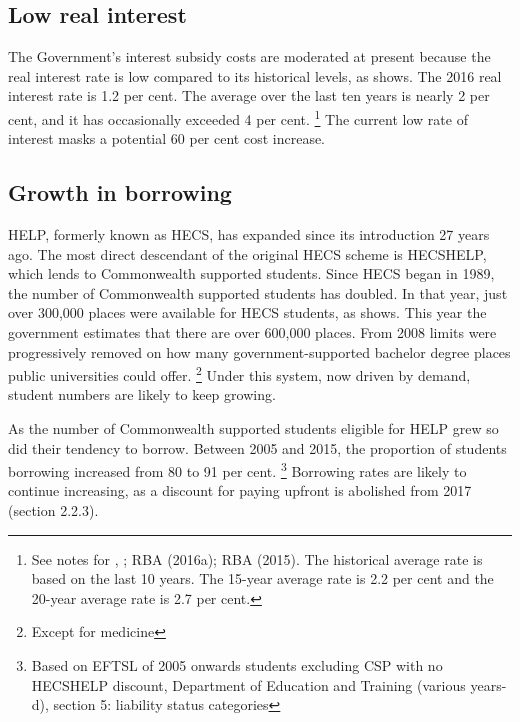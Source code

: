 \documentclass[embargoed]{grattan}
\begin{document}
\subsection{Low real interest}\label{low-real-interest}

The Government's interest subsidy costs are moderated at present because the real interest rate is low compared to its historical levels, as  shows.
The 2016 real interest rate is 1.2 per cent.
The average over the last ten years is nearly 2 per cent, and it has occasionally exceeded 4 per cent.%
\footnote{See notes for , \textcite{ABS2016ConsumerPriceIndex}; RBA (2016a); RBA (2015).
The historical average rate is based on the last 10 years.
The 15-year average rate is 2.2 per cent and the 20-year average rate is 2.7 per cent.} The current low rate of interest masks a potential 60 per cent cost increase.

\subsection{Growth in borrowing}\label{growth-in-borrowing} 

\gls{HELP}, formerly known as \gls{HECS}, has expanded since its introduction 27 years ago.
The most direct descendant of the original \gls{HECS} scheme is \gls{HECSHELP}, which lends to Commonwealth supported students.
Since \gls{HECS} began in 1989, the number of Commonwealth supported students has doubled.
In that year, just over 300,000 places were available for \gls{HECS} students, as  shows.\afterpage{\cleardoublepage} %
This year the government estimates that there are over 600,000 places.
From 2008 limits were progressively removed on how many government-supported bachelor degree places public universities could offer.%
\footnote{Except for medicine} Under this system, now driven by demand, student numbers are likely to keep growing.


As the number of Commonwealth supported students eligible for \gls{HELP} grew so did their tendency to borrow.
Between 2005 and 2015, the proportion of students borrowing increased from 80 to 91 per cent.%
\footnote{Based on \gls{EFTSL} of 2005 onwards students excluding CSP with no \gls{HECSHELP} discount, Department of Education and Training (various years-d), section 5: liability status categories} Borrowing rates are likely to continue increasing, as a discount for paying upfront is abolished from 2017 (section 2.2.3).
\end{document}
